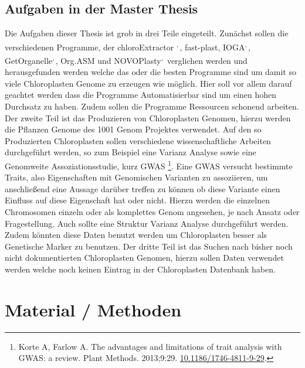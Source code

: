 \documentclass{scrartcl}
\begin{document}
\subsection{Aufgaben in der Master Thesis}
\label{sec-2-7}
Die Aufgaben dieser Thesis ist grob in drei Teile eingeteilt. Zunächst sollen die verschiedenen Programme, der chloroExtractor \footnotemark[9]{}\textsuperscript{,}\,\footnotemark[10]{}, fast-plast\footnotemark[15]{}, IOGA\footnotemark[23]{}\textsuperscript{,}\,\footnotemark[24]{}, GetOrganelle\footnotemark[21]{}\textsuperscript{,}\,\footnotemark[22]{},
Org.ASM \footnotemark[18]{}und NOVOPlasty\footnotemark[16]{}\textsuperscript{,}\,\footnotemark[17]{} verglichen werden und herausgefunden werden welche das oder die besten Programme sind um damit so viele Chloroplasten Genome zu erzeugen wie 
möglich. Hier soll vor allem darauf geachtet werden dass die Programme Automatisierbar sind um einen hohen Durchsatz zu haben. Zudem sollen die Programme Ressourcen schonend arbeiten. 
Der zweite Teil ist das Produzieren von Chloroplasten Genomen, hierzu werden die Pflanzen Genome des 1001 Genom Projektes verwendet. Auf den so
Produzierten Chloroplasten sollen verschiedene wissenschaftliche Arbeiten durchgeführt werden, so zum Beispiel eine Varianz Analyse sowie eine Genomweite Assoziationsstudie, kurz GWAS \footnote{Korte A, Farlow A. The advantages and limitations of trait analysis with GWAS: a review. Plant Methods. 2013;9:29. \url{10.1186/1746-4811-9-29}.}.
Eine GWAS versucht bestimmte Traits, also Eigenschaften mit Genomischen Varianten zu assoziieren, um anschließend eine Aussage darüber treffen zu können ob diese Variante einen Einfluss auf diese 
Eigenschaft hat oder nicht. Hierzu werden die einzelnen Chromosomen einzeln oder als komplettes Genom angesehen, je nach Ansatz oder Fragestellung.
Auch sollte eine Struktur Varianz Analyse durchgeführt werden. Zudem könnten diese Daten benutzt werden um Chloroplasten besser als Genetische Marker zu benutzen. 
Der dritte Teil ist das Suchen nach bisher noch nicht dokumentierten Chloroplasten Genomen, hierzu sollen Daten verwendet werden welche noch keinen Eintrag in der Chloroplasten Datenbank haben.



\section{Material / Methoden}
\label{sec-3}
\end{document}

